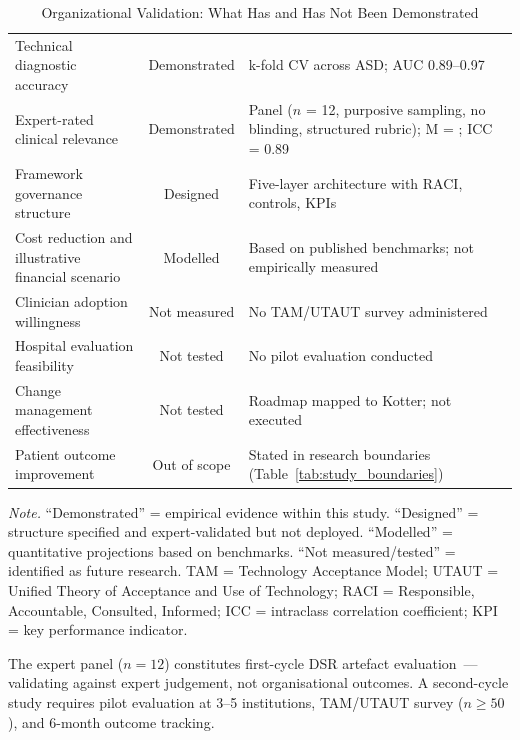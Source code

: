 \begin{table}[!htbp]
\tablestripes\tablefontsize
\caption[Organizational Validation Status]{Organizational Validation: What Has and Has Not Been Demonstrated}
\begin{tabularx}{\textwidth}{@{} L C L @{}}
\toprule
{} &  &  \\
\midrule
Technical diagnostic accuracy & Demonstrated & k-fold CV across ASD; AUC 0.89--0.97 \\
\addlinespace
Expert-rated clinical relevance & Demonstrated & Panel ($n$ = 12, purposive sampling, no blinding, structured rubric); M = \expertM{}; ICC = 0.89 \\
\addlinespace
Framework governance structure & Designed & Five-layer architecture with RACI, controls, KPIs \\
\addlinespace
Cost reduction and illustrative financial scenario & Modelled & Based on published benchmarks; not empirically measured \\
\addlinespace
Clinician adoption willingness & Not measured & No TAM/UTAUT survey administered \\
\addlinespace
Hospital evaluation feasibility & Not tested & No pilot evaluation conducted \\
\addlinespace
Change management effectiveness & Not tested & Roadmap mapped to Kotter; not executed \\
\addlinespace
Patient outcome improvement & Out of scope & Stated in research boundaries (Table~\ref{tab:study_boundaries}) \\
\bottomrule
\end{tabularx}
\vspace{0.5em}\noindent\textit{Note.} ``Demonstrated'' = empirical evidence within this study. ``Designed'' = structure specified and expert-validated but not deployed. ``Modelled'' = quantitative projections based on benchmarks. ``Not measured/tested'' = identified as future research. TAM = Technology Acceptance Model; UTAUT = Unified Theory of Acceptance and Use of Technology; RACI = Responsible, Accountable, Consulted, Informed; ICC = intraclass correlation coefficient; KPI = key performance indicator.
\end{table}

\noindent The expert panel ($n = 12$) constitutes first-cycle DSR artefact evaluation~\cite{hevner2004design}---validating against expert judgement, not organisational outcomes. A second-cycle study requires pilot evaluation at 3--5 institutions, TAM/UTAUT survey ($n \geq 50$), and 6-month outcome tracking.

